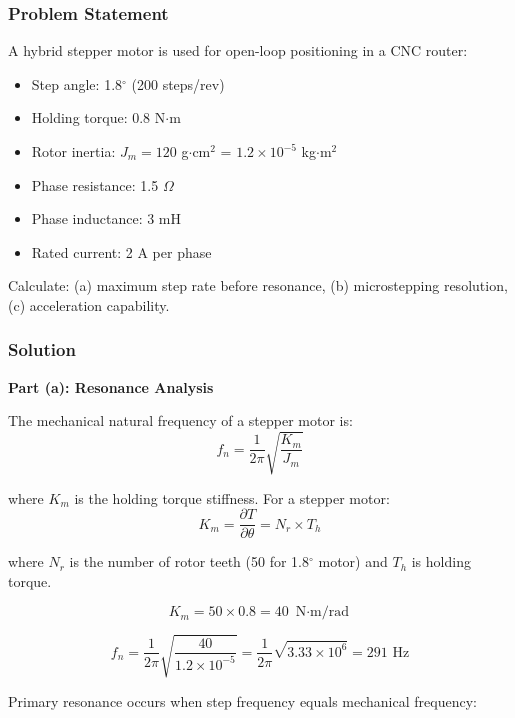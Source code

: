 \subsubsection{Problem Statement}

A hybrid stepper motor is used for open-loop positioning in a CNC router:
\begin{itemize}
    \item Step angle: 1.8$^\circ$ (200 steps/rev)
    \item Holding torque: 0.8 N$\cdot$m
    \item Rotor inertia: $J_m = 120$ g$\cdot$cm$^2$ = $1.2 \times 10^{-5}$ kg$\cdot$m$^2$
    \item Phase resistance: 1.5 $\Omega$
    \item Phase inductance: 3 mH
    \item Rated current: 2 A per phase
\end{itemize}

Calculate: (a) maximum step rate before resonance, (b) microstepping resolution, (c) acceleration capability.

\subsubsection{Solution}

\textbf{Part (a): Resonance Analysis}

The mechanical natural frequency of a stepper motor is:
\begin{equation}
    f_n = \frac{1}{2\pi}\sqrt{\frac{K_m}{J_m}}
\end{equation}

where $K_m$ is the holding torque stiffness. For a stepper motor:
\begin{equation}
    K_m = \frac{\partial T}{\partial \theta} = N_r \times T_h
\end{equation}

where $N_r$ is the number of rotor teeth (50 for 1.8$^\circ$ motor) and $T_h$ is holding torque.

\begin{equation}
    K_m = 50 \times 0.8 = 40 \text{ N$\cdot$m/rad}
\end{equation}

\begin{equation}
    f_n = \frac{1}{2\pi}\sqrt{\frac{40}{1.2 \times 10^{-5}}} = \frac{1}{2\pi}\sqrt{3.33 \times 10^6} = 291 \text{ Hz}
\end{equation}

Primary resonance occurs when step frequency equals mechanical frequency:

